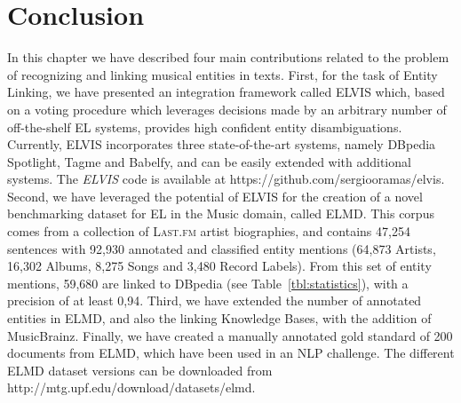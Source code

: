 \section{Conclusion}
\label{sec:elmd}

In this chapter we have described four main contributions related to the problem of recognizing and linking musical entities in texts. First, for the task of Entity Linking, we have presented an integration framework called \textsc{ELVIS} which, based on a voting procedure which leverages decisions made by an arbitrary number of off-the-shelf EL systems, provides high confident entity disambiguations. Currently, \textsc{ELVIS} incorporates three state-of-the-art systems, namely DBpedia Spotlight, Tagme and Babelfy, and can be easily extended with additional systems. The \textit{ELVIS} code is available at {\footnotesize{https://github.com/sergiooramas/elvis}}. Second, we have leveraged the potential of \textsc{ELVIS} for the creation of a novel benchmarking dataset for EL in the Music domain, called \textsc{ELMD}. This corpus comes from a collection of \textsc{Last.fm} artist biographies, and contains 47,254 sentences with 92,930 annotated and classified entity mentions (64,873 Artists, 16,302 Albums, 8,275 Songs and 3,480 Record Labels). From this set of entity mentions, 59,680 are linked to DBpedia (see Table~\ref{tbl:statistics}), with a precision of at least 0,94.
Third, we have extended the number of annotated entities in ELMD, and also the linking Knowledge Bases, with the addition of MusicBrainz.
Finally, we have created a manually annotated gold standard of 200 documents from ELMD, which have been used in an NLP challenge.
The different \textsc{ELMD} dataset versions can be downloaded from {\footnotesize{http://mtg.upf.edu/download/datasets/elmd}}.
